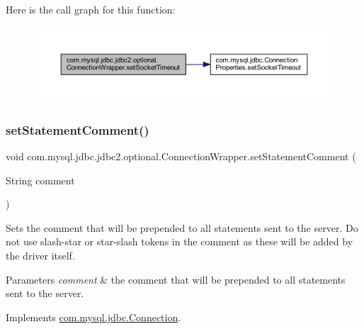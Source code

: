 Here is the call graph for this function\+:
\nopagebreak
\begin{figure}[H]
\begin{center}
\leavevmode
\includegraphics[width=350pt]{classcom_1_1mysql_1_1jdbc_1_1jdbc2_1_1optional_1_1_connection_wrapper_a9714df2e97bd14e45f7f7a93ba7f4673_cgraph}
\end{center}
\end{figure}
\mbox{\label{classcom_1_1mysql_1_1jdbc_1_1jdbc2_1_1optional_1_1_connection_wrapper_a31c5d98ba9578549f71ddae31c27fc7b}} 
\subsubsection{\texorpdfstring{set\+Statement\+Comment()}{setStatementComment()}}
{\footnotesize\ttfamily void com.\+mysql.\+jdbc.\+jdbc2.\+optional.\+Connection\+Wrapper.\+set\+Statement\+Comment (\begin{DoxyParamCaption}\item[{String}]{comment }\end{DoxyParamCaption})}

Sets the comment that will be prepended to all statements sent to the server. Do not use slash-\/star or star-\/slash tokens in the comment as these will be added by the driver itself.


\begin{DoxyParams}{Parameters}
{\em comment} & the comment that will be prepended to all statements sent to the server. \\
\hline
\end{DoxyParams}


Implements \mbox{\hyperlink{interfacecom_1_1mysql_1_1jdbc_1_1_connection_a94f38f8f7d8afd2a7bf6c87ad0d5d422}{com.\+mysql.\+jdbc.\+Connection}}.


